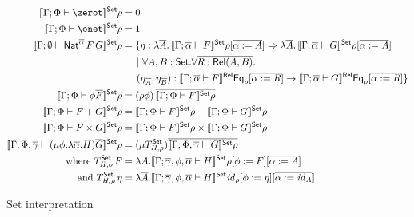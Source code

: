\documentclass[runningheads]{llncs}
\newcommand{\set}{\mathsf{Set}}
\renewcommand{\id}{\mathit{id}}
\renewcommand{\id}{\mathit{id}}
\begin{document}
\begin{figure}[t]
  \begin{adjustbox}{varwidth=5in, max width=5in, fbox, center}
  \begin{align*}
  \setsem{\Gamma;\Phi \vdash \zerot}\rho &= 0\\
  \setsem{\Gamma;\Phi \vdash \onet}\rho &= 1\\
  \setsem{\Gamma; \emptyset
    \vdash \Nat^{\ol{\alpha}}
    \,F\,G}\rho &= \{\eta : \lambda \ol{A}. \,\setsem{\Gamma;
    \ol{\alpha} \vdash
    F}\rho[\ol{\alpha := A}] 
      \Rightarrow \lambda \ol{A}.\,\setsem{\Gamma; 
        \ol{\alpha} \vdash G}\rho[\ol{\alpha := A}] \\ 
      &\hspace{0.2in}|~\forall \overline{A}, \overline{B} :
      \set. \forall \overline{R : \rel(A, B)}.\\ 
      &\hspace{0.2in}(\eta_{\overline{A}}, \eta_{\overline{B}})
      : \relsem{\Gamma; \ol{\alpha} \vdash F}\Eq_{\rho}[\ol{\alpha := R}]
      \rightarrow \relsem{\Gamma; \ol{\alpha} \vdash
        G}\Eq_{\rho}[\ol{\alpha := R}] \} \\
  \setsem{\Gamma;\Phi \vdash \phi\ol{F}}\rho &=
  (\rho\phi)\,\ol{\setsem{\Gamma;\Phi \vdash
    F}\rho}\\
  \setsem{\Gamma;\Phi \vdash F+G}\rho &=
  \setsem{\Gamma;\Phi \vdash F}\rho +
  \setsem{\Gamma;\Phi \vdash G}\rho\\
  \setsem{\Gamma;\Phi \vdash F\times G}\rho &=
  \setsem{\Gamma;\Phi \vdash F}\rho \times
  \setsem{\Gamma;\Phi \vdash G}\rho\\ 
  \setsem{\Gamma;\Phi,\ol\gamma \vdash (\mu \phi.\lambda
    \ol{\alpha}. H)\ol{G}}\rho &= (\mu
    T^\set_{H,\rho})\ol{\setsem{\Gamma;\Phi,\ol\gamma \vdash G}\rho}\\
    \text{where } T^\set_{H,\rho}\,F & = \lambda
  \ol{A}. \setsem{\Gamma;\ol\gamma,\phi, \ol{\alpha} \vdash
    H}\rho[\phi :=  F][\ol{\alpha := A}]\\
  \text{and } T^\set_{H,\rho}\,\eta &= \lambda
  \ol{A}. \setsem{\Gamma;\ol\gamma,\phi, \ol{\alpha} \vdash
    H}\id_\rho[\phi := \eta][\ol{\alpha := \id_{A}}]
\end{align*}
\vspace*{-0.3in}\caption{Set interpretation}\label{fig:set-sem} 
\vspace*{-0.15in}
\end{adjustbox}
  \end{figure}
\end{document}
